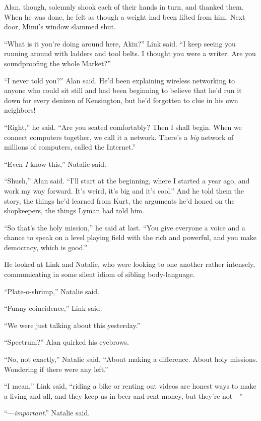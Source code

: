 \documentclass{article}
\begin{document}
Alan, though, solemnly shook each of their hands in turn, and thanked
them.  When he was done, he felt as though a weight had been lifted
from him.  Next door, Mimi's window slammed shut.

``What is it you're doing around here, Akin?'' Link said.  ``I keep
seeing you running around with ladders and tool belts.  I thought you
were a writer.  Are you soundproofing the whole Market?''

``I never told you?'' Alan said.  He'd been explaining wireless
networking to anyone who could sit still and had been beginning to
believe that he'd run it down for every denizen of Kensington, but
he'd forgotten to clue in his own neighbors!

``Right,'' he said.  ``Are you seated comfortably?  Then I shall
begin.  When we connect computers together, we call it a network. 
There's a \textit{big} network of millions of computers, called the
Internet.''

``Even \textit{I} know this,'' Natalie said.

``Shush,'' Alan said.  ``I'll start at the beginning, where I started
a year ago, and work my way forward.  It's weird, it's big and it's
cool.'' And he told them the story, the things he'd learned from Kurt,
the arguments he'd honed on the shopkeepers, the things Lyman had told
him.

``So that's the holy mission,'' he said at last.  ``You give everyone
a voice and a chance to speak on a level playing field with the rich
and powerful, and you make democracy, which is good.''

He looked at Link and Natalie, who were looking to one another rather
intensely, communicating in some silent idiom of sibling
body-language.

``Plate-o-shrimp,'' Natalie said.

``Funny coincidence,'' Link said.

``We were just talking about this yesterday.''

``Spectrum?'' Alan quirked his eyebrows.

``No, not exactly,'' Natalie said.  ``About making a difference. 
About holy missions.  Wondering if there were any left.''

``I mean,'' Link said, ``riding a bike or renting out videos are
honest ways to make a living and all, and they keep us in beer and
rent money, but they're not---''

``---\textit{important}.'' Natalie said.
\end{document}
